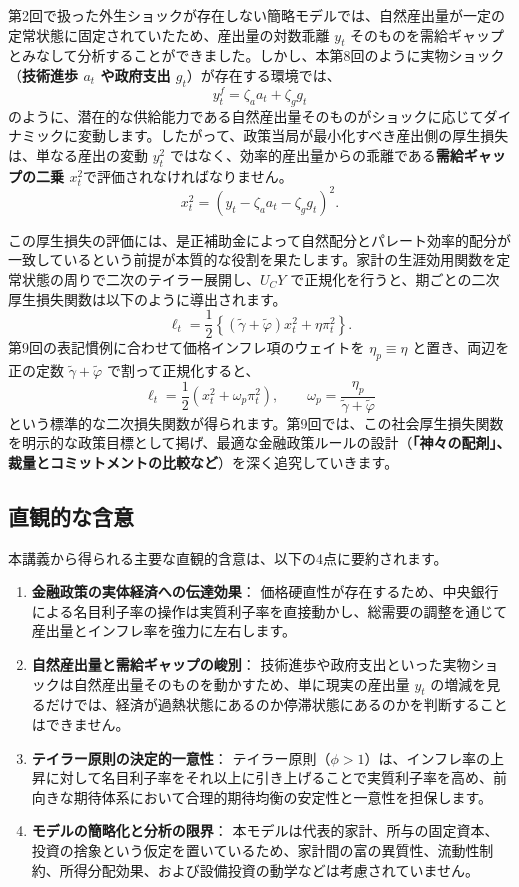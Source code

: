 \documentclass[
  japanese,
  lualatex,
  ja=standard,
  12pt,
  a4paper]{ltjsarticle}
\providecommand{\tightlist}{%
  \setlength{\itemsep}{0pt}\setlength{\parskip}{0pt}}
\begin{document}
第2回で扱った外生ショックが存在しない簡略モデルでは、自然産出量が一定の定常状態に固定されていたため、産出量の対数乖離
\(y_t\)
そのものを需給ギャップとみなして分析することができました。しかし、本第8回のように実物ショック（\textbf{技術進歩
\(a_t\) や政府支出 \(g_t\)}）が存在する環境では、 \[
y_t^f=\zeta_a a_t+\zeta_g g_t
\]
のように、潜在的な供給能力である自然産出量そのものがショックに応じてダイナミックに変動します。したがって、政策当局が最小化すべき産出側の厚生損失は、単なる産出の変動
\(y_t^2\)
ではなく、効率的産出量からの乖離である\textbf{需給ギャップの二乗
\(x_t^2\)}で評価されなければなりません。 \[
x_t^2
=
\left(y_t-\zeta_a a_t-\zeta_g g_t\right)^2.
\]

この厚生損失の評価には、是正補助金によって自然配分とパレート効率的配分が一致しているという前提が本質的な役割を果たします。家計の生涯効用関数を定常状態の周りで二次のテイラー展開し、\(U_C Y\)
で正規化を行うと、期ごとの二次厚生損失関数は以下のように導出されます。
\[
\ell_t
=
\frac{1}{2}
\left\{
(\tilde{\gamma}+\tilde{\varphi})x_t^2
+\eta\pi_t^2
\right\}.
\] 第9回の表記慣例に合わせて価格インフレ項のウェイトを
\(\eta_p \equiv \eta\) と置き、両辺を正の定数
\(\tilde{\gamma}+\tilde{\varphi}\) で割って正規化すると、 \[
\ell_t
=
\frac{1}{2}\left(x_t^2+\omega_p\pi_t^2\right),
\qquad
\omega_p
=
\frac{\eta_p}{\tilde{\gamma}+\tilde{\varphi}}
\]
という標準的な二次損失関数が得られます。第9回では、この社会厚生損失関数を明示的な政策目標として掲げ、最適な金融政策ルールの設計（\textbf{「神々の配剤」、裁量とコミットメントの比較など}）を深く追究していきます。

\subsection{直観的な含意}\label{ux76f4ux89b3ux7684ux306aux542bux610f}

本講義から得られる主要な直観的含意は、以下の4点に要約されます。

\begin{enumerate}
\def\labelenumi{\arabic{enumi}.}
\tightlist
\item
  \textbf{金融政策の実体経済への伝達効果}：
  価格硬直性が存在するため、中央銀行による名目利子率の操作は実質利子率を直接動かし、総需要の調整を通じて産出量とインフレ率を強力に左右します。
\item
  \textbf{自然産出量と需給ギャップの峻別}：
  技術進歩や政府支出といった実物ショックは自然産出量そのものを動かすため、単に現実の産出量
  \(y_t\)
  の増減を見るだけでは、経済が過熱状態にあるのか停滞状態にあるのかを判断することはできません。
\item
  \textbf{テイラー原則の決定的一意性}：
  テイラー原則（\(\phi>1\)）は、インフレ率の上昇に対して名目利子率をそれ以上に引き上げることで実質利子率を高め、前向きな期待体系において合理的期待均衡の安定性と一意性を担保します。
\item
  \textbf{モデルの簡略化と分析の限界}：
  本モデルは代表的家計、所与の固定資本、投資の捨象という仮定を置いているため、家計間の富の異質性、流動性制約、所得分配効果、および設備投資の動学などは考慮されていません。
\end{enumerate}
\end{document}
